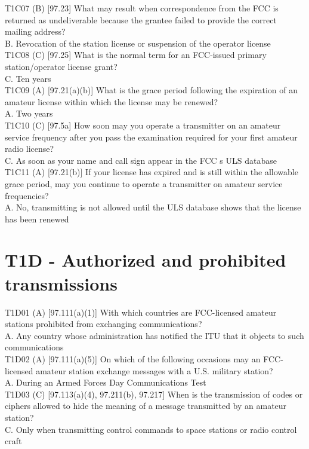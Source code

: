 \documentclass[12pt,letterpaper]{report}
\begin{document}
T1C07 (B) [97.23] What may result when correspondence from the FCC is returned as undeliverable because the grantee failed to provide the correct mailing address?\\
B. Revocation of the station license or suspension of the operator license\\

T1C08 (C) [97.25] What is the normal term for an FCC-issued primary station/operator license grant?\\
C. Ten years\\

T1C09 (A) [97.21(a)(b)] What is the grace period following the expiration of an amateur license within which the license may be renewed?\\
A. Two years\\

T1C10 (C) [97.5a] How soon may you operate a transmitter on an amateur service frequency after you pass the examination required for your first amateur radio license?\\
C. As soon as your name and call sign appear in the FCC s ULS database\\

T1C11 (A) [97.21(b)] If your license has expired and is still within the allowable grace period, may you continue to operate a transmitter on amateur service frequencies?\\
A. No, transmitting is not allowed until the ULS database shows that the license has been renewed\\

\section{T1D - Authorized and prohibited transmissions}

T1D01 (A) [97.111(a)(1)] With which countries are FCC-licensed amateur stations prohibited from exchanging communications?\\
A. Any country whose administration has notified the ITU that it objects to such communications\\

T1D02 (A) [97.111(a)(5)] On which of the following occasions may an FCC-licensed amateur station exchange messages with a U.S. military station?\\
A. During an Armed Forces Day Communications Test\\

T1D03 (C) [97.113(a)(4), 97.211(b), 97.217] When is the transmission of codes or ciphers allowed to hide the meaning of a message transmitted by an amateur station?\\
C. Only when transmitting control commands to space stations or radio control craft\\
\end{document}
